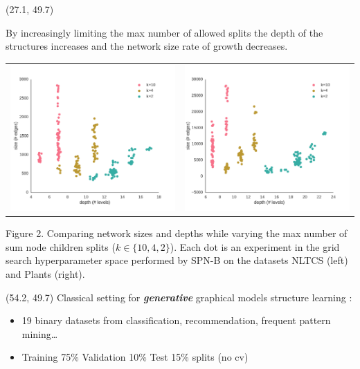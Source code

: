 \documentclass[final]{beamer}
\begin{document}
\begin{frame}{}
  \begin{textblock}{25.7}(27.1, 49.7)

    \footnotesize
    By increasingly limiting the max number of allowed splits the depth of the
    structures increases and the network size rate of growth
    decreases.  
    \begin{table}[ht]
      \setlength{\tabcolsep}{30pt}  
      \centering
      \begin{tabular}{c c}
        \includegraphics[width=0.4\linewidth]{figures/nltcs-depth.pdf}&\includegraphics[width=0.4\linewidth]{figures/plants-depth.pdf}
      \end{tabular}
    \end{table}
    \vspace{-20pt}
    \begin{center}
      \begin{minipage}[t]{0.9\linewidth}
        \tiny\flushleft
        Figure 2. Comparing network sizes and depths while varying the max
        number of sum node children splits ($k\in\{10, 4, 2\}$). Each dot is an experiment
        in the grid search hyperparameter space performed by
        \textsf{SPN-B} on the datasets NLTCS (left) and
        Plants (right).
      \end{minipage}
    \end{center}

    
  \end{textblock}
  
  \begin{textblock}{25.7}(54.2, 49.7)
    \footnotesize
    Classical setting for \emph{\textbf{generative}} graphical models
    structure learning \parencite{Gens2013}:
    \setlength{\leftmargini}{30pt}
    \begin{itemize}
      \itemsep 7pt
    \item 19 binary datasets from classification, recommendation,
      frequent pattern mining\dots \parencite{Lowd2010} \parencite{Haaren2012}
    \item Training 75\% Validation 10\% Test 15\%  splits (no cv)
    \end{itemize}\bigskip


\end{textblock}
\end{frame}
\end{document}
